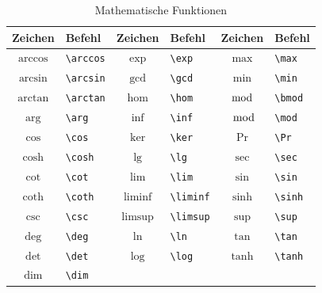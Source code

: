 \documentclass[a4paper,10pt,twoside]{scrbook}
\begin{document}
{\begin{table}[h!tb]
\centering
\caption{Mathematische Funktionen}
\label{Tabelle_Mathematische_Funktionen}       %
\begin{tabular}{clclcl}
\hline
Zeichen & Befehl & Zeichen & Befehl & Zeichen & Befehl \\
\hline
$\arccos$ & \texttt{\textbackslash arccos} & 
$\exp$ & \texttt{\textbackslash exp} & 
$\max$ & \texttt{\textbackslash max} \\
$\arcsin$  & \texttt{\textbackslash arcsin} & 
$\gcd$ & \texttt{\textbackslash gcd} & 
$\min$ & \texttt{\textbackslash min} \\
$\arctan$ & \texttt{\textbackslash arctan} & 
$\hom$ & \texttt{\textbackslash hom} & 
$\bmod$ & \texttt{\textbackslash bmod} \\
$\arg$ & \texttt{\textbackslash arg} & 
$\inf$ & \texttt{\textbackslash inf} & 
$\mod$ & \texttt{\textbackslash mod} \\
$\cos$ & \texttt{\textbackslash cos} & 
$\ker$ & \texttt{\textbackslash ker} & 
$\Pr$ & \texttt{\textbackslash Pr} \\
$\cosh$ & \texttt{\textbackslash cosh} & 
$\lg$ & \texttt{\textbackslash lg} & 
$\sec$ & \texttt{\textbackslash sec} \\
$\cot$ & \texttt{\textbackslash cot} & 
$\lim$ & \texttt{\textbackslash lim} & 
$\sin$ & \texttt{\textbackslash sin} \\
$\coth$ & \texttt{\textbackslash coth} & 
$\liminf$ & \texttt{\textbackslash liminf} & 
$\sinh$ & \texttt{\textbackslash sinh} \\
$\csc$ & \texttt{\textbackslash csc} &
$\limsup$ & \texttt{\textbackslash limsup} & 
$\sup$ & \texttt{\textbackslash sup} \\
$\deg$ & \texttt{\textbackslash deg} & 
$\ln$ & \texttt{\textbackslash ln} & 
$\tan$ & \texttt{\textbackslash tan} \\
$\det$ & \texttt{\textbackslash det} & 
$\log$ & \texttt{\textbackslash log} & 
$\tanh$ & \texttt{\textbackslash tanh} \\
$\dim$ & \texttt{\textbackslash dim} & & & & \\
\hline
\end{tabular}

\end{table}}
\end{document}
